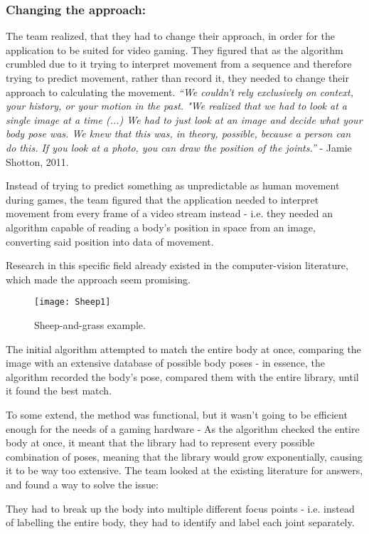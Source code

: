 \subsubsection*{Changing the approach:}
The team realized, that they had to change their approach, in order for the application to be suited for video gaming. They figured that as the algorithm crumbled due to it trying to interpret movement from a sequence and therefore trying to predict movement, rather than record it, they needed to change their approach to calculating the movement. \textit{“We couldn’t rely exclusively on context, your history, or your motion in the past. "We realized that we had to look at a single image at a time (...) We had to just look at an image and decide what your body pose was. We knew that this was, in theory, possible, because a person can do this. If you look at a photo, you can draw the position of the joints.”} - Jamie Shotton, 2011.

Instead of trying to predict something as unpredictable as human movement during games, the team figured that the application needed to interpret movement from every frame of a video stream instead - i.e. they needed an algorithm capable of reading a body's position in space from an image, converting said position into data of movement.

Research in this specific field already existed in the computer-vision literature, which made the approach seem promising.

\begin{figure}[h] 
\centering
\texttt{[image: Sheep1]} 
\caption{Sheep-and-grass example.}
\label{fig:Sheep}
\end{figure}
\bigskip

The initial algorithm attempted to match the entire body at once, comparing the image with an extensive database of possible body poses - in essence, the algorithm recorded the body's pose, compared them with the entire library, until it found the best match.

To some extend, the method was functional, but it wasn't going to be efficient enough for the needs of a gaming hardware - As the algorithm checked the entire body at once, it meant that the library had to represent every possible combination of poses, meaning that the library would grow exponentially, causing it to be way too extensive. \parencite{Knies}
The team looked at the existing literature for answers, and found a way to solve the issue:

They had to break up the body into multiple different focus points - i.e. instead of labelling the entire body, they had to identify and label each joint separately.

